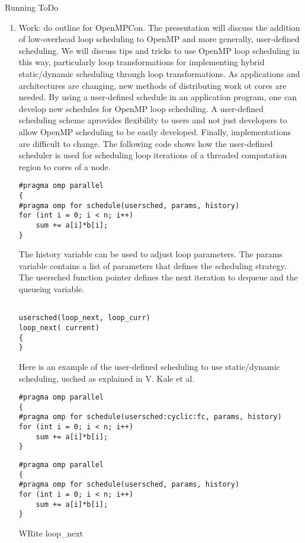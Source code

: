 \begin{columns}
\begin{column}{0.6\linewidth}
\begin{block}{Running ToDo}
\begin{enumerate}
      \item \tiny Work: do outline for OpenMPCon.
        The presentation will discuss the addition of low-overhead loop scheduling to OpenMP and more generally, user-defined scheduling. We will discuss tips and tricks to use OpenMP loop scheduling in this way, particularly loop transformations for implementing hybrid static/dynamic scheduling through loop transformations.  
As applications and architectures are changing, new methods of distributing work ot cores are needed.  
By using a user-defined schedule in an application program, one can develop new schedules for OpenMP loop scheduling. A user-defined scheduling scheme aprovides flexibility to users and not just developers to allow OpenMP scheduling to be easily developed.
Finally, implementations are difficult to change. 
The following code shows how the user-defined scheduler is used for scheduling loop iterations of a threaded computation region to cores of a node. 
\begin{verbatim}
#pragma omp parallel
{
#pragma omp for schedule(usersched, params, history)
for (int i = 0; i < n; i++)
    sum += a[i]*b[i];
}
\end{verbatim}

The history variable can be used to adjust loop parameters.
The params variable contains a list of parameters that defines the scheduling strategy. 
The usersched function pointer defines the next iteration to dequeue and the queueing variable. 

\begin{verbatim} 

usersched(loop_next, loop_curr)
loop_next( current)
{ 
} 

\end{verbatim} 

Here is an example of the user-defined scheduling to use static/dynamic scheduling, usched as explained in V. Kale et al\cite{}.

\begin{verbatim}
#pragma omp parallel
{
#pragma omp for schedule(usersched:cyclic:fc, params, history)
for (int i = 0; i < n; i++)
    sum += a[i]*b[i];
}
\end{verbatim} 

\begin{verbatim}
#pragma omp parallel
{
#pragma omp for schedule(usersched, params, history)
for (int i = 0; i < n; i++)
    sum += a[i]*b[i];
}
\end{verbatim} 

WRite loop\_next 


\end{enumerate}
\end{block}
\end{column}
\end{columns}
